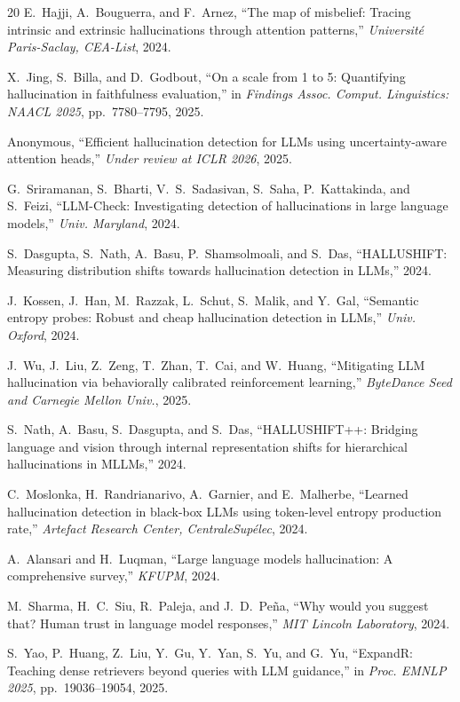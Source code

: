 \documentclass[journal]{IEEEtran}
\begin{document}
\begin{thebibliography}{20}
E.~Hajji, A.~Bouguerra, and F.~Arnez, ``The map of misbelief: Tracing intrinsic and extrinsic hallucinations through attention patterns,'' \emph{Universit\'{e} Paris-Saclay, CEA-List}, 2024.

X.~Jing, S.~Billa, and D.~Godbout, ``On a scale from 1 to 5: Quantifying hallucination in faithfulness evaluation,'' in \emph{Findings Assoc. Comput. Linguistics: NAACL 2025}, pp.~7780--7795, 2025.

Anonymous, ``Efficient hallucination detection for LLMs using uncertainty-aware attention heads,'' \emph{Under review at ICLR 2026}, 2025.

G.~Sriramanan, S.~Bharti, V.~S.~Sadasivan, S.~Saha, P.~Kattakinda, and S.~Feizi, ``LLM-Check: Investigating detection of hallucinations in large language models,'' \emph{Univ. Maryland}, 2024.

S.~Dasgupta, S.~Nath, A.~Basu, P.~Shamsolmoali, and S.~Das, ``HALLUSHIFT: Measuring distribution shifts towards hallucination detection in LLMs,'' 2024.

J.~Kossen, J.~Han, M.~Razzak, L.~Schut, S.~Malik, and Y.~Gal, ``Semantic entropy probes: Robust and cheap hallucination detection in LLMs,'' \emph{Univ. Oxford}, 2024.

J.~Wu, J.~Liu, Z.~Zeng, T.~Zhan, T.~Cai, and W.~Huang, ``Mitigating LLM hallucination via behaviorally calibrated reinforcement learning,'' \emph{ByteDance Seed and Carnegie Mellon Univ.}, 2025.

S.~Nath, A.~Basu, S.~Dasgupta, and S.~Das, ``HALLUSHIFT++: Bridging language and vision through internal representation shifts for hierarchical hallucinations in MLLMs,'' 2024.

C.~Moslonka, H.~Randrianarivo, A.~Garnier, and E.~Malherbe, ``Learned hallucination detection in black-box LLMs using token-level entropy production rate,'' \emph{Artefact Research Center, CentraleSup\'{e}lec}, 2024.

A.~Alansari and H.~Luqman, ``Large language models hallucination: A comprehensive survey,'' \emph{KFUPM}, 2024.

M.~Sharma, H.~C.~Siu, R.~Paleja, and J.~D.~Pe\~{n}a, ``Why would you suggest that? Human trust in language model responses,'' \emph{MIT Lincoln Laboratory}, 2024.

S.~Yao, P.~Huang, Z.~Liu, Y.~Gu, Y.~Yan, S.~Yu, and G.~Yu, ``ExpandR: Teaching dense retrievers beyond queries with LLM guidance,'' in \emph{Proc. EMNLP 2025}, pp.~19036--19054, 2025.

\end{thebibliography}

\vfill
\end{document}
